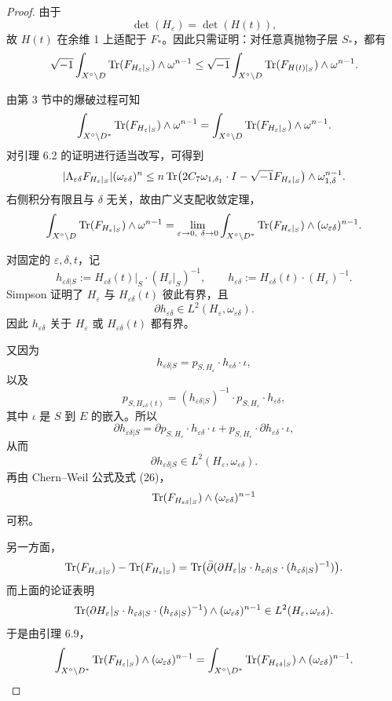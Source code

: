 \begin{proof}
由于
\[
\det(H_{\varepsilon})=\det(H(t)),
\]
故 \(H(t)\) 在余维 1 上适配于 \(F_*\)。因此只需证明：对任意真抛物子层 \(S_*\)，都有
\[
\sqrt{-1}\int_{X^\circ\setminus D}\operatorname{Tr}(F_{H_{\varepsilon}|_S})\wedge \omega^{n-1}
\le
\sqrt{-1}\int_{X^\circ\setminus D}\operatorname{Tr}(F_{H(t)|_S})\wedge \omega^{n-1}.
\]

由第 3 节中的爆破过程可知
\[
\int_{X^\circ\setminus D^*}\operatorname{Tr}(F_{H_{\varepsilon}|_S})\wedge \omega^{n-1}
=
\int_{X^\circ\setminus D}\operatorname{Tr}(F_{H_{\varepsilon}|_S})\wedge \omega^{n-1}.
\]
对引理 6.2 的证明进行适当改写，可得到
\[
|\Lambda_{\varepsilon\delta} F_{H_{\varepsilon}|_S}|(\omega_{\varepsilon\delta})^n
\le
n\operatorname{Tr}\bigl(2C_7\omega_{1,\delta_1}\cdot I-\sqrt{-1}F_{H_{\varepsilon}|_S}\bigr)\wedge \omega_{1,\delta}^{n-1}.
\]
右侧积分有限且与 \(\delta\) 无关，故由广义支配收敛定理，
\[
\int_{X^\circ\setminus D}\operatorname{Tr}(F_{H_{\varepsilon}|_S})\wedge \omega^{n-1}
=
\lim_{\varepsilon\to 0,\ \delta\to 0}
\int_{X^\circ\setminus D^*}\operatorname{Tr}(F_{H_{\varepsilon}|_S})\wedge (\omega_{\varepsilon\delta})^{n-1}.
\]

对固定的 \(\varepsilon,\delta,t\)，记
\[
h_{\varepsilon\delta|S}:=H_{\varepsilon\delta}(t)|_S\cdot (H_{\varepsilon}|_S)^{-1},
\qquad
h_{\varepsilon\delta}:=H_{\varepsilon\delta}(t)\cdot (H_{\varepsilon})^{-1}.
\]
Simpson \cite{Si1} 证明了 \(H_{\varepsilon}\) 与 \(H_{\varepsilon\delta}(t)\) 彼此有界，且
\[
\partial h_{\varepsilon\delta}\in L^2(H_{\varepsilon},\omega_{\varepsilon\delta}).
\]
因此 \(h_{\varepsilon\delta}\) 关于 \(H_{\varepsilon}\) 或 \(H_{\varepsilon\delta}(t)\) 都有界。

又因为
\[
h_{\varepsilon\delta|S}=p_{S,H_{\varepsilon}}\cdot h_{\varepsilon\delta} \cdot \iota, \tag{25}
\]
以及
\[
p_{S,H_{\varepsilon\delta}(t)}
=
(h_{\varepsilon\delta|S})^{-1}\cdot p_{S,H_{\varepsilon}}\cdot h_{\varepsilon\delta}, \tag{26}
\]
其中 \(\iota\) 是 \(S\) 到 \(E\) 的嵌入。所以
\[
\partial h_{\varepsilon\delta|S}
=
\partial p_{S,H_{\varepsilon}}\cdot h_{\varepsilon\delta}\cdot \iota
+
p_{S,H_{\varepsilon}}\cdot \partial h_{\varepsilon\delta}\cdot \iota,
\]
从而
\[
\partial h_{\varepsilon\delta|S}\in L^2(H_{\varepsilon},\omega_{\varepsilon\delta}).
\]
再由 Chern--Weil 公式及式 (26)，
\[
\operatorname{Tr}(F_{H_{\varepsilon\delta}|_S})\wedge (\omega_{\varepsilon\delta})^{n-1}
\]
可积。

另一方面，
\[
\operatorname{Tr}(F_{H_{\varepsilon\delta}|_S})-\operatorname{Tr}(F_{H_{\varepsilon}|_S})
=
\operatorname{Tr}\bigl(\bar\partial(\partial H_{\varepsilon}|_S\cdot h_{\varepsilon\delta|S}\cdot (h_{\varepsilon\delta|S})^{-1})\bigr).
\]
而上面的论证表明
\[
\operatorname{Tr}(\partial H_{\varepsilon}|_S\cdot h_{\varepsilon\delta|S}\cdot (h_{\varepsilon\delta|S})^{-1})
\wedge (\omega_{\varepsilon\delta})^{n-1}
\in L^2(H_{\varepsilon},\omega_{\varepsilon\delta}).
\]
于是由引理 6.9，
\[
\int_{X^\circ\setminus D^*}
\operatorname{Tr}(F_{H_{\varepsilon}|_S})\wedge (\omega_{\varepsilon\delta})^{n-1}
=
\int_{X^\circ\setminus D^*}
\operatorname{Tr}(F_{H_{\varepsilon\delta}|_S})\wedge (\omega_{\varepsilon\delta})^{n-1}.
\]


\end{proof}
